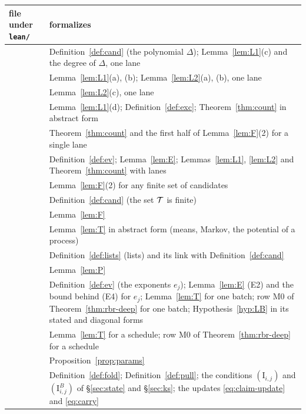 {\small
\begin{longtable}{@{}L{0.34\textwidth}L{0.62\textwidth}@{}}
\toprule
file under \texttt{lean/} & formalizes\\
\midrule
\endhead
{} & Definition~\ref{def:cand} (the polynomial $\Delta$); Lemma~\ref{lem:L1}(c) and the degree of $\Delta$, one lane\\
 & Lemma~\ref{lem:L1}(a), (b); Lemma~\ref{lem:L2}(a), (b), one lane\\
 & Lemma~\ref{lem:L2}(c), one lane\\
 & Lemma~\ref{lem:L1}(d); Definition~\ref{def:exc}; Theorem~\ref{thm:count} in abstract form\\
 & Theorem~\ref{thm:count} and the first half of Lemma~\ref{lem:F}(2) for a single lane\\
 & Definition~\ref{def:ev}; Lemma~\ref{lem:E}; Lemmas~\ref{lem:L1}, \ref{lem:L2} and Theorem~\ref{thm:count} with lanes\\
 & Lemma~\ref{lem:F}(2) for any finite set of candidates\\
 & Definition~\ref{def:cand} (the set $\mathcal{T}$ is finite)\\
 & Lemma~\ref{lem:F}\\
\addlinespace
{} & Lemma~\ref{lem:T} in abstract form (means, Markov, the potential of a process)\\
 & Definition~\ref{def:lists} (lists) and its link with Definition~\ref{def:cand}\\
 & Lemma~\ref{lem:P}\\
 & Definition~\ref{def:ev} (the exponents $e_j$); Lemma~\ref{lem:E} (E2) and the bound behind (E4) for $e_j$; Lemma~\ref{lem:T} for one batch; row M0 of Theorem~\ref{thm:rbr-deep} for one batch; Hypothesis~\ref{hyp:LB} in its stated and diagonal forms\\
 & Lemma~\ref{lem:T} for a schedule; row M0 of Theorem~\ref{thm:rbr-deep} for a schedule\\
 & Proposition~\ref{prop:params}\\
\addlinespace
{} & Definition~\ref{def:fold}; Definition~\ref{def:pull}; the conditions $(\mathrm I_{i,j})$ and $(\mathrm I^B_{i,j})$ of \S\ref{sec:state} and \S\ref{sec:ks}; the updates \eqref{eq:claim-update} and \eqref{eq:carry}\\

\end{longtable}}
